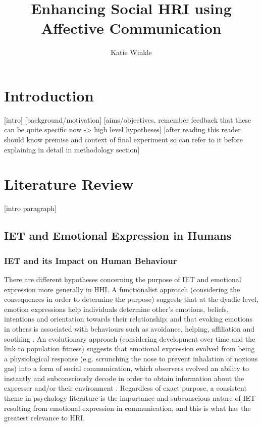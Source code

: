 \documentclass[11pt,a4paper]{report}
\title{Enhancing Social HRI using Affective Communication}
\author{Katie Winkle}
\begin{document}
\maketitle
\tableofcontents

\chapter{Introduction}
[intro]
[background/motivation]
[aims/objectives, remember feedback that these can be quite specific now -> high level hypotheses]
[after reading this reader should know premise and context of final experiment so can refer to it before explaining in detail in methodology section]

\chapter{Literature Review}
[intro paragraph]
\section{IET and Emotional Expression in Humans}

\subsection{IET and its Impact on Human Behaviour}
There are different hypotheses concerning the purpose of IET and emotional expression more generally in HHI. A functionalist approach (considering the consequences in order to determine the purpose) suggests that at the dyadic level, emotion expressions help individuals determine other's emotions, beliefs, intentions and orientation towards their relationship; and that evoking emotions in others is associated with behaviours such as avoidance, helping, affiliation and soothing \cite{keltner1999social}. An evolutionary approach (considering development over time and the link to population fitness) suggests that emotional expression evolved from being a physiological response (e.g. scrunching the nose to prevent inhalation of noxious gas) into a form of social communication, which observers evolved an ability to instantly and subconsciously decode in order to obtain information about the expresser and/or their environment \cite{shariff2011emotion}. Regardless of exact purpose, a consistent theme in psychology literature is the importance and subconscious nature of IET resulting from emotional expression in communication, and this is what has the greatest relevance to HRI. 
\end{document}
